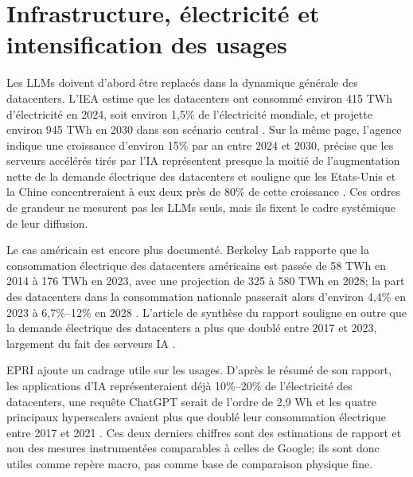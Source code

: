 \documentclass[11pt,a4paper]{article}
\begin{document}
\section{Infrastructure, électricité et intensification des usages}
Les LLMs doivent d'abord être replacés dans la dynamique générale des datacenters. L'IEA estime que les datacenters ont consommé environ 415 TWh d'électricité en 2024, soit environ 1,5\% de l'électricité mondiale, et projette environ 945 TWh en 2030 dans son scénario central \cite{iea2025}. Sur la même page, l'agence indique une croissance d'environ 15\% par an entre 2024 et 2030, précise que les serveurs accélérés tirés par l'IA représentent presque la moitié de l'augmentation nette de la demande électrique des datacenters et souligne que les Etats-Unis et la Chine concentreraient à eux deux près de 80\% de cette croissance \cite{iea2025}. Ces ordres de grandeur ne mesurent pas les LLMs seuls, mais ils fixent le cadre systémique de leur diffusion.

Le cas américain est encore plus documenté. Berkeley Lab rapporte que la consommation électrique des datacenters américains est passée de 58 TWh en 2014 à 176 TWh en 2023, avec une projection de 325 à 580 TWh en 2028; la part des datacenters dans la consommation nationale passerait alors d'environ 4,4\% en 2023 à 6,7\%--12\% en 2028 \cite{lbl2025}. L'article de synthèse du rapport souligne en outre que la demande électrique des datacenters a plus que doublé entre 2017 et 2023, largement du fait des serveurs IA \cite{lbl2025}.

EPRI ajoute un cadrage utile sur les usages. D'après le résumé de son rapport, les applications d'IA représenteraient déjà 10\%--20\% de l'électricité des datacenters, une requête ChatGPT serait de l'ordre de 2,9 Wh et les quatre principaux hyperscalers avaient plus que doublé leur consommation électrique entre 2017 et 2021 \cite{epri2024}. Ces deux derniers chiffres sont des estimations de rapport et non des mesures instrumentées comparables à celles de Google; ils sont donc utiles comme repère macro, pas comme base de comparaison physique fine.
\end{document}
